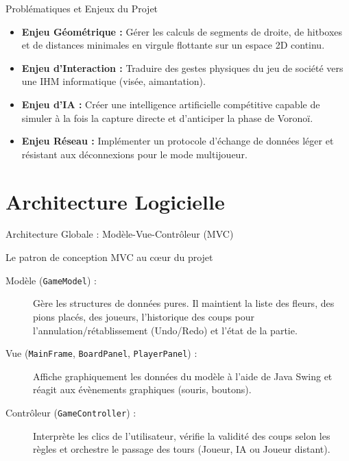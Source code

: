 \documentclass{beamer}
\begin{document}
\begin{frame}{Problématiques et Enjeux du Projet}
    \begin{itemize}
        \item \textbf{Enjeu Géométrique :} Gérer les calculs de segments de droite, de hitboxes et de distances minimales en virgule flottante sur un espace 2D continu.
        \item \textbf{Enjeu d'Interaction :} Traduire des gestes physiques du jeu de société vers une IHM informatique (visée, aimantation).
        \item \textbf{Enjeu d'IA :} Créer une intelligence artificielle compétitive capable de simuler à la fois la capture directe et d'anticiper la phase de Voronoï.
        \item \textbf{Enjeu Réseau :} Implémenter un protocole d'échange de données léger et résistant aux déconnexions pour le mode multijoueur.
    \end{itemize}
\end{frame}

\section{Architecture Logicielle}

\begin{frame}{Architecture Globale : Modèle-Vue-Contrôleur (MVC)}
    \begin{block}{Le patron de conception MVC au cœur du projet}
        \begin{description}
            \item[Modèle (\texttt{GameModel}) :] Gère les structures de données pures. Il maintient la liste des fleurs, des pions placés, des joueurs, l'historique des coups pour l'annulation/rétablissement (Undo/Redo) et l'état de la partie.
            \item[Vue (\texttt{MainFrame}, \texttt{BoardPanel}, \texttt{PlayerPanel}) :] Affiche graphiquement les données du modèle à l'aide de Java Swing et réagit aux évènements graphiques (souris, boutons).
            \item[Contrôleur (\texttt{GameController}) :] Interprète les clics de l'utilisateur, vérifie la validité des coups selon les règles et orchestre le passage des tours (Joueur, IA ou Joueur distant).
        \end{description}
    \end{block}
\end{frame}
\end{document}
